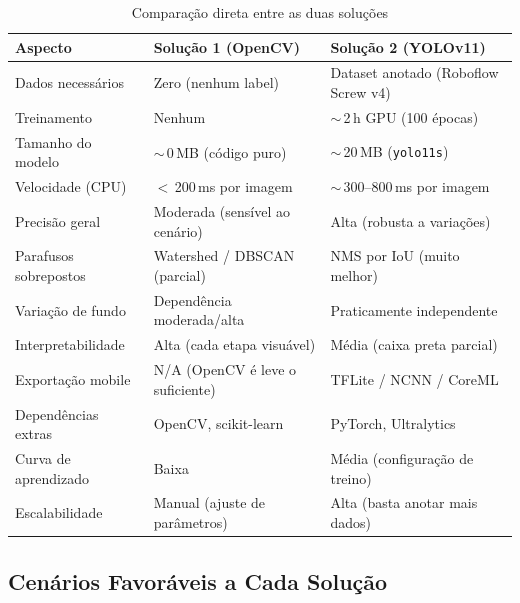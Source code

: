 \documentclass[12pt,a4paper]{article}
\begin{document}
\begin{table}[H]
  \centering
  \caption{Compara\c{c}\~ao direta entre as duas solu\c{c}\~oes}
  \label{tab:comp}
  \renewcommand{\arraystretch}{1.25}
  \begin{tabular}{p{4.2cm}p{4.5cm}p{4.5cm}}
    \toprule
    \textbf{Aspecto} & \textbf{Solu\c{c}\~ao 1 (OpenCV)} &
    \textbf{Solu\c{c}\~ao 2 (YOLOv11)} \\
    \midrule
    Dados necess\'arios
      & Zero (nenhum label)
      & Dataset anotado (Roboflow Screw v4) \\
    Treinamento
      & Nenhum
      & $\sim$\,2\,h GPU (100 \'epocas) \\
    Tamanho do modelo
      & $\sim$\,0\,MB (c\'odigo puro)
      & $\sim$\,20\,MB (\texttt{yolo11s}) \\
    Velocidade (CPU)
      & $<$\,200\,ms por imagem
      & $\sim$\,300--800\,ms por imagem \\
    Precis\~ao geral
      & Moderada (sens\'ivel ao cen\'ario)
      & Alta (robusta a varia\c{c}\~oes) \\
    Parafusos sobrepostos
      & Watershed / DBSCAN (parcial)
      & NMS por IoU (muito melhor) \\
    Varia\c{c}\~ao de fundo
      & Depend\^encia moderada/alta
      & Praticamente independente \\
    Interpretabilidade
      & Alta (cada etapa visu\'avel)
      & M\'edia (caixa preta parcial) \\
    Exporta\c{c}\~ao mobile
      & N/A (OpenCV \'e leve o suficiente)
      & TFLite / NCNN / CoreML \\
    Depend\^encias extras
      & OpenCV, scikit-learn
      & PyTorch, Ultralytics \\
    Curva de aprendizado
      & Baixa
      & M\'edia (configura\c{c}\~ao de treino) \\
    Escalabilidade
      & Manual (ajuste de par\^ametros)
      & Alta (basta anotar mais dados) \\
    \bottomrule
  \end{tabular}
\end{table}

\subsection{Cen\'arios Favor\'aveis a Cada Solu\c{c}\~ao}
\end{document}
